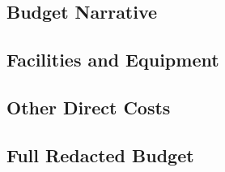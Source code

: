 \documentclass[usenames,dvipsnames,modern]{CLASS_FILES/aastex631}  %
\begin{document}
\subsection{Budget Narrative}
\label{subsec:budgetNarrative}

\subsection{Facilities and Equipment}


\newpage
\subsection{Other Direct Costs}


\newpage


\newpage
\subsection{Full Redacted Budget}
\end{document}
